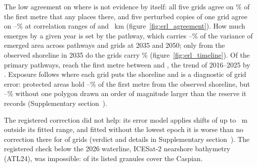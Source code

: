 The low agreement on where is not evidence by itself: all five grids agree on \% of the first metre that any places there, and five perturbed copies of one grid agree on --\% at correlation ranges of  and ~km (figure~\ref{fig:erl_agreement}). How much emerges by a given year is set by the pathway, which carries --\% of the variance of emerged area across pathways and grids at 2035 and 2050; only from the observed shoreline in 2035 do the grids carry \% (figure~\ref{fig:erl_timeline}). Of the  primary pathways,  reach the first metre between  and , the trend of 2016--2025 by . Exposure follows where each grid puts the shoreline and is a diagnostic of grid error: protected areas hold --\% of the first metre from the observed shoreline, but --\% without one polygon drawn an order of magnitude larger than the reserve it records (Supplementary section~\SInearterm).

The registered correction did not help: its error model applies shifts of up to ~m outside its fitted range, and fitted without the lowest epoch it is worse than no correction there for  of  grids (verdict and details in Supplementary section~\SInearterm). The registered check below the 2026 waterline, ICESat-2 nearshore bathymetry (ATL24)\citep{atl24_v2}, was impossible:  of its  listed granules cover the Caspian.
